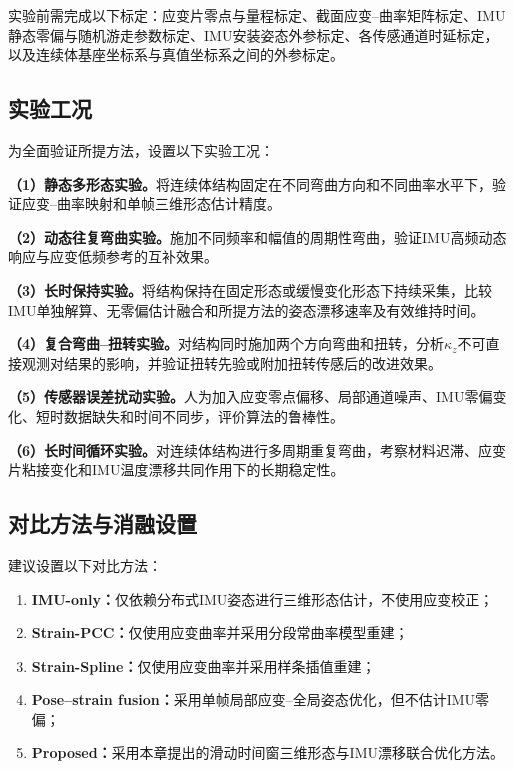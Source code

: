 实验前需完成以下标定：应变片零点与量程标定、截面应变--曲率矩阵标定、IMU静态零偏与随机游走参数标定、IMU安装姿态外参标定、各传感通道时延标定，以及连续体基座坐标系与真值坐标系之间的外参标定。

\subsection{实验工况}

为全面验证所提方法，设置以下实验工况：

\textbf{（1）静态多形态实验。}将连续体结构固定在不同弯曲方向和不同曲率水平下，验证应变--曲率映射和单帧三维形态估计精度。

\textbf{（2）动态往复弯曲实验。}施加不同频率和幅值的周期性弯曲，验证IMU高频动态响应与应变低频参考的互补效果。

\textbf{（3）长时保持实验。}将结构保持在固定形态或缓慢变化形态下持续采集，比较IMU单独解算、无零偏估计融合和所提方法的姿态漂移速率及有效维持时间。

\textbf{（4）复合弯曲--扭转实验。}对结构同时施加两个方向弯曲和扭转，分析$\kappa_z$不可直接观测对结果的影响，并验证扭转先验或附加扭转传感后的改进效果。

\textbf{（5）传感器误差扰动实验。}人为加入应变零点偏移、局部通道噪声、IMU零偏变化、短时数据缺失和时间不同步，评价算法的鲁棒性。

\textbf{（6）长时间循环实验。}对连续体结构进行多周期重复弯曲，考察材料迟滞、应变片粘接变化和IMU温度漂移共同作用下的长期稳定性。

\subsection{对比方法与消融设置}

建议设置以下对比方法：

\begin{enumerate}
    \item \textbf{IMU-only：}仅依赖分布式IMU姿态进行三维形态估计，不使用应变校正；
    \item \textbf{Strain-PCC：}仅使用应变曲率并采用分段常曲率模型重建；
    \item \textbf{Strain-Spline：}仅使用应变曲率并采用样条插值重建；
    \item \textbf{Pose--strain fusion：}采用单帧局部应变--全局姿态优化，但不估计IMU零偏；
    \item \textbf{Proposed：}采用本章提出的滑动时间窗三维形态与IMU漂移联合优化方法。
\end{enumerate}


